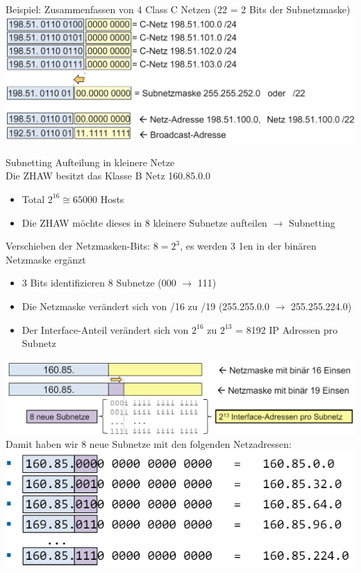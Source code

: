 \begin{example}
    Beispiel: Zusammenfassen von 4 Class C Netzen (22 = 2 Bits der Subnetzmaske)\\
        \includegraphics[width=1\linewidth]{images/example_supernetting.png}
\end{example}

\begin{concept}{Subnetting}
    Aufteilung in kleinere Netze\\
    Die ZHAW besitzt das Klasse B Netz 160.85.0.0
    \begin{itemize}
        \item Total $2^{16} \cong 65000$  Hosts
        \item Die ZHAW möchte dieses in 8 kleinere Subnetze aufteilen $\rightarrow$ Subnetting
    \end{itemize}
    Verschieben der Netzmasken-Bits: $8 = 2^3$, es werden 3 1en in der binären Netzmaske ergänzt
    \begin{itemize}
        \item 3 Bits identifizieren 8 Subnetze (000 $\rightarrow$ 111)
        \item Die Netzmaske verändert sich von /16 zu /19 (255.255.0.0 $\rightarrow$ 255.255.224.0)
        \item Der Interface-Anteil verändert sich von $2^{16}$ zu $2^{13}$ = 8192 IP Adressen pro Subnetz
    \end{itemize}
        \includegraphics[width=1\linewidth]{images/subnetting1.png}\\
    Damit haben wir 8 neue Subnetze mit den folgenden Netzadressen:\\
        \includegraphics[width=0.75\linewidth]{images/subnetting2.png}

\end{concept}
